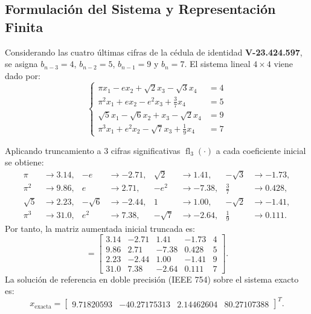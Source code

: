 \documentclass[11pt,letterpaper]{article}
\begin{document}
\subsection{Formulación del Sistema y Representación Finita}
Considerando las cuatro últimas cifras de la cédula de identidad \textbf{V-23.424.597}, se asigna $b_{n-3} = 4$, $b_{n-2} = 5$, $b_{n-1} = 9$ y $b_n = 7$. El sistema lineal $4 \times 4$ viene dado por:
\begin{equation}
    \left\{
    \begin{aligned}
        \pi x_1 - e x_2 + \sqrt{2} x_3 - \sqrt{3} x_4 &= 4 \\
        \pi^2 x_1 + e x_2 - e^2 x_3 + \tfrac{3}{7} x_4 &= 5 \\
        \sqrt{5} x_1 - \sqrt{6} x_2 + x_3 - \sqrt{2} x_4 &= 9 \\
        \pi^3 x_1 + e^2 x_2 - \sqrt{7} x_3 + \tfrac{1}{9} x_4 &= 7
    \end{aligned}
    \right.
\end{equation}

Aplicando truncamiento a $3$ cifras significativas $\operatorname{fl}_3(\cdot)$ a cada coeficiente inicial se obtiene:
\begin{align*}
    \pi &\to 3.14, & -e &\to -2.71, & \sqrt{2} &\to 1.41, & -\sqrt{3} &\to -1.73, \\
    \pi^2 &\to 9.86, & e &\to 2.71, & -e^2 &\to -7.38, & \tfrac{3}{7} &\to 0.428, \\
    \sqrt{5} &\to 2.23, & -\sqrt{6} &\to -2.44, & 1 &\to 1.00, & -\sqrt{2} &\to -1.41, \\
    \pi^3 &\to 31.0, & e^2 &\to 7.38, & -\sqrt{7} &\to -2.64, & \tfrac{1}{9} &\to 0.111.
\end{align*}
Por tanto, la matriz aumentada inicial truncada es:
\begin{equation}
    [A^{(0)} \mid b^{(0)}] =
    \left[
    \begin{array}{cccc|c}
        3.14 & -2.71 &  1.41 & -1.73 & 4 \\
        9.86 &  2.71 & -7.38 & 0.428 & 5 \\
        2.23 & -2.44 &  1.00 & -1.41 & 9 \\
        31.0 &  7.38 & -2.64 & 0.111 & 7
    \end{array}
    \right].
\end{equation}
La solución de referencia en doble precisión (IEEE 754) sobre el sistema exacto es:
\begin{equation}
    x_{\text{exacta}} = \begin{bmatrix} 9.71820593 & -40.27175313 & 2.14462604 & 80.27107388 \end{bmatrix}^T.
\end{equation}
\end{document}

